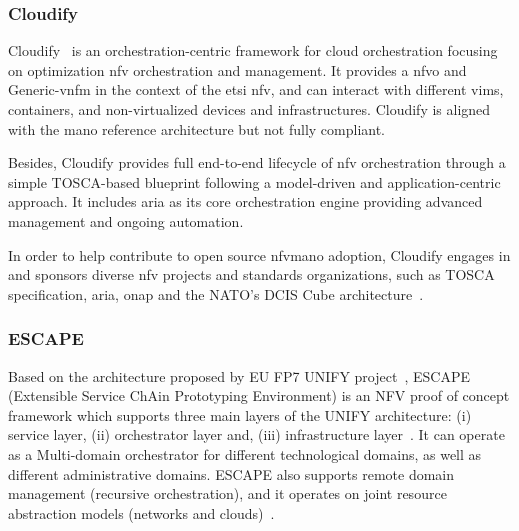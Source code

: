 
\subsubsection{Cloudify}
Cloudify~\cite{GigaSpaces2015} is an orchestration-centric framework for cloud orchestration focusing on optimization \gls{nfv} orchestration and management. It provides a \gls{nfvo} and Generic-\gls{vnfm} in the context of the \gls{etsi} \gls{nfv}, and can interact with different \glspl{vim}, containers, and non-virtualized devices and infrastructures. Cloudify is aligned with the \gls{mano} reference architecture but not fully compliant. 

Besides, Cloudify provides full end-to-end lifecycle of \gls{nfv} orchestration through a simple TOSCA-based blueprint following a model-driven and application-centric approach. It includes \gls{aria} as its core orchestration engine providing advanced management and ongoing automation.

In order to help contribute to open source \gls{nfvmano} adoption, Cloudify engages in and sponsors diverse \gls{nfv} projects and standards organizations, such as TOSCA specification, \gls{aria}, \gls{onap} and the NATO's DCIS Cube architecture~\cite{dcisCube}.

\subsubsection{ESCAPE}
Based on the architecture proposed by EU FP7 UNIFY project~\cite{unify}, ESCAPE (Extensible Service ChAin Prototyping Environment) is an NFV proof of concept framework which supports three main layers of the UNIFY architecture: (i) service layer, (ii) orchestrator layer and, (iii) infrastructure layer~\cite{csoma2014escape}. It can operate as a Multi-domain orchestrator for different technological domains, as well as different administrative domains. ESCAPE also supports remote domain management (recursive orchestration), and it operates on joint resource abstraction models (networks and clouds)~\cite{sonkoly2015multi}.  

